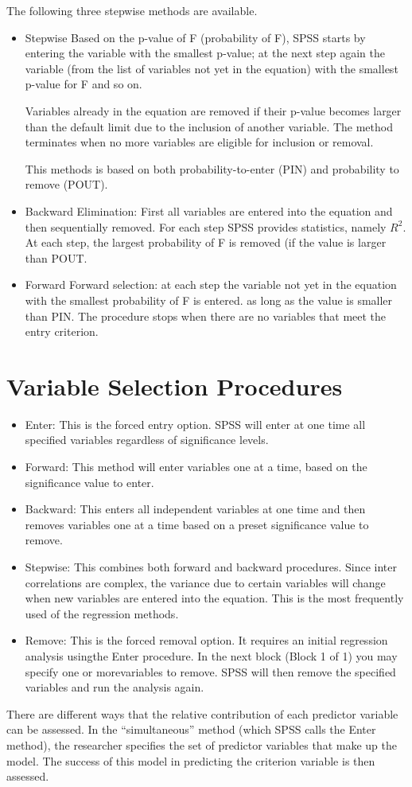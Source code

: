 \documentclass[a4paper,12pt]{article}
\begin{document}
The following three stepwise methods are available.

\begin{itemize}
	\item Stepwise Based on the p-value of F (probability of F), SPSS starts by entering the variable with the smallest p-value; at the next step again the variable (from the list of variables not yet in the equation) with the smallest p-value for F and so on. 
	
	Variables already in the equation are removed if their p-value becomes larger than the default limit due to the inclusion of another variable. The method terminates when no more variables are eligible for inclusion or removal.	
	
	This methods is based on both probability-to-enter (PIN) and probability to remove (POUT).
	\item Backward Elimination: First all variables are entered into the equation and then sequentially removed. For each step SPSS provides statistics, namely $R^2$. At each step, the largest probability of F is removed (if the value is larger than POUT.
	\item Forward Forward selection: at each step the variable not yet in the equation with the smallest probability of F is entered. as long as the value is smaller than PIN. The procedure stops when there are no variables that meet the entry criterion.
\end{itemize}
\newpage


\section{Variable Selection Procedures}

\begin{itemize}
	\item Enter: This is the forced entry option. SPSS will enter at one time all specified variables regardless of significance levels.
	\item Forward: This method will enter variables one at a time, based on the significance value to enter.
	\item Backward: This enters all independent variables at one time and then removes variables one at a time based on a preset significance value to remove.
	\item Stepwise: This combines both forward and backward procedures. Since inter correlations are complex, the variance due to certain variables will change when new variables are entered into the equation. This is the most frequently used of the regression methods.
	\item Remove: This is the forced removal option. It requires an initial regression analysis usingthe Enter procedure. In the next block (Block 1 of 1) you may specify one or morevariables to remove. SPSS will then remove the specified variables and run the analysis again.
\end{itemize}
There are different ways that the relative contribution of each predictor variable can be assessed. In the “simultaneous” method (which SPSS calls the Enter method), the researcher specifies the set of predictor variables that make up the model. The success of this model in predicting the criterion variable is then assessed.
\end{document}
